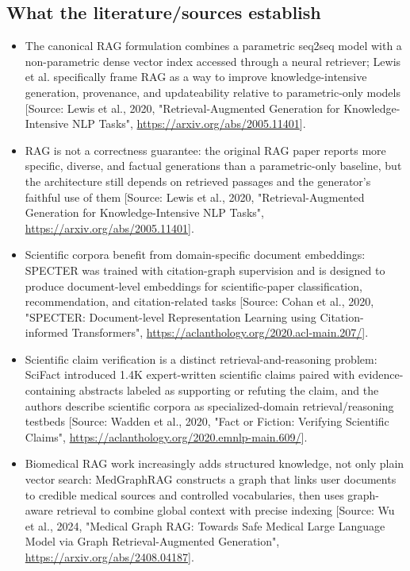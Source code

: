 \documentclass[11pt]{report}
\begin{document}
\subsection{What the literature/sources establish}
\begin{itemize}
\item The canonical RAG formulation combines a parametric seq2seq model with a non-parametric dense vector index accessed through a neural retriever; Lewis et al. specifically frame RAG as a way to improve knowledge-intensive generation, provenance, and updateability relative to parametric-only models [Source: Lewis et al., 2020, "Retrieval-Augmented Generation for Knowledge-Intensive NLP Tasks", \url{https://arxiv.org/abs/2005.11401}].
\item RAG is not a correctness guarantee: the original RAG paper reports more specific, diverse, and factual generations than a parametric-only baseline, but the architecture still depends on retrieved passages and the generator's faithful use of them [Source: Lewis et al., 2020, "Retrieval-Augmented Generation for Knowledge-Intensive NLP Tasks", \url{https://arxiv.org/abs/2005.11401}].
\item Scientific corpora benefit from domain-specific document embeddings: SPECTER was trained with citation-graph supervision and is designed to produce document-level embeddings for scientific-paper classification, recommendation, and citation-related tasks [Source: Cohan et al., 2020, "SPECTER: Document-level Representation Learning using Citation-informed Transformers", \url{https://aclanthology.org/2020.acl-main.207/}].
\item Scientific claim verification is a distinct retrieval-and-reasoning problem: SciFact introduced 1.4K expert-written scientific claims paired with evidence-containing abstracts labeled as supporting or refuting the claim, and the authors describe scientific corpora as specialized-domain retrieval/reasoning testbeds [Source: Wadden et al., 2020, "Fact or Fiction: Verifying Scientific Claims", \url{https://aclanthology.org/2020.emnlp-main.609/}].
\item Biomedical RAG work increasingly adds structured knowledge, not only plain vector search: MedGraphRAG constructs a graph that links user documents to credible medical sources and controlled vocabularies, then uses graph-aware retrieval to combine global context with precise indexing [Source: Wu et al., 2024, "Medical Graph RAG: Towards Safe Medical Large Language Model via Graph Retrieval-Augmented Generation", \url{https://arxiv.org/abs/2408.04187}].

\end{itemize}
\end{document}
